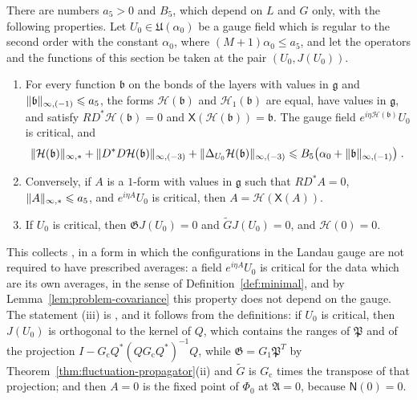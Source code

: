 \documentclass[11pt]{preprint}
\DeclarePairedDelimiter{\norm}{\lVert}{\rVert}
\numberwithin{equation}{section}
\begin{document}
\begin{theorem}\label{thm:critical}
There are numbers $a_5 > 0$ and $B_5$, which depend on $L$ and $G$ only, with the following properties. Let $U_0 \in \mathfrak U(\alpha_0)$ be a gauge field which is regular to the second order with the constant $\alpha_0$, where $(M + 1)\alpha_0 \leqslant a_5$, and let the operators and the functions of this section be taken at the pair $(U_0, J(U_0))$.
\begin{enumerate}[label=(\roman*)]
\item For every function $\mathfrak b$ on the bonds of the layers with values in $\mathfrak g$ and $\norm{\mathfrak b}_{\infty,(-1)} \leqslant a_5$, the forms $\mathcal H(\mathfrak b)$ and $\mathcal H_1(\mathfrak b)$ are equal, have values in $\mathfrak g$, and satisfy $RD^*\mathcal H(\mathfrak b) = 0$ and $\mathsf X(\mathcal H(\mathfrak b)) = \mathfrak b$. The gauge field $e^{i\eta\mathcal H(\mathfrak b)}U_0$ is critical, and
\begin{equation}\label{eq:critical-bounds}
    \norm{\mathcal H(\mathfrak b)}_{\infty,*} + \norm{D^*D\mathcal H(\mathfrak b)}_{\infty,(-3)} + \norm{\Delta_{U_0}\mathcal H(\mathfrak b)}_{\infty,(-3)} \leqslant B_5\bigl(\alpha_0 + \norm{\mathfrak b}_{\infty,(-1)}\bigr)\;.
\end{equation}
\item Conversely, if $A$ is a $1$-form with values in $\mathfrak g$ such that $RD^*A = 0$, $\norm A_{\infty,*} \leqslant a_5$, and $e^{i\eta A}U_0$ is critical, then $A = \mathcal H(\mathsf X(A))$.
\item If $U_0$ is critical, then $\mathfrak GJ(U_0) = 0$ and $\tilde GJ(U_0) = 0$, and $\mathcal H(0) = 0$.
\end{enumerate}
\end{theorem}

This collects \cite[Propositions~2, 5, and~7]{BalabanVAR}, in a form in which the configurations in the Landau gauge are not required to have prescribed averages: a field $e^{i\eta A}U_0$ is critical for the data which are its own averages, in the sense of Definition~\ref{def:minimal}, and by Lemma~\ref{lem:problem-covariance} this property does not depend on the gauge. The statement (iii) is \cite[(170), (171), (178)]{BalabanVAR}, and it follows from the definitions: if $U_0$ is critical, then $J(U_0)$ is orthogonal to the kernel of $Q$, which contains the ranges of $\mathfrak P$ and of the projection $I - G_{\mathrm c}Q^*(QG_{\mathrm c}Q^*)^{-1}Q$, while $\mathfrak G = G_1\mathfrak P^T$ by Theorem~\ref{thm:fluctuation-propagator}(ii) and $\tilde G$ is $G_{\mathrm c}$ times the transpose of that projection; and then $A = 0$ is the fixed point of $\Phi_0$ at $\mathfrak A = 0$, because $\mathsf N(0) = 0$.
\end{document}
